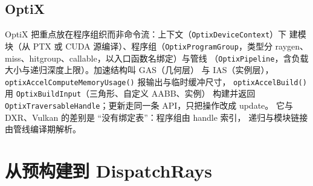 \documentclass[12pt,a4paper,fontset=fandol]{ctexbook}
\newcommand{\Fn}[1]{\texttt{#1()}}
\newcommand{\Tp}[1]{\texttt{#1}}
\begin{document}
\subsection{OptiX}

OptiX 把重点放在程序组织而非命令流：上下文（\Tp{OptixDeviceContext}）下
建模块（从 PTX 或 CUDA 源编译）、程序组（\Tp{OptixProgramGroup}，类型分
raygen、miss、hitgroup、callable，以入口函数名绑定）与管线
（\Tp{OptixPipeline}，含负载大小与递归深度上限）。加速结构叫 GAS（几何层）
与 IAS（实例层），\Fn{optixAccelComputeMemoryUsage} 报输出与临时缓冲尺寸，
\Fn{optixAccelBuild} 用 \Tp{OptixBuildInput}（三角形、自定义 AABB、实例）
构建并返回 \Tp{OptixTraversableHandle}；更新走同一条 API，只把操作改成 update。
它与 DXR、Vulkan 的差别是 ``没有绑定表''：程序组由 handle 索引，
递归与模块链接由管线编译期解析。

\section{从预构建到 DispatchRays}
\end{document}
